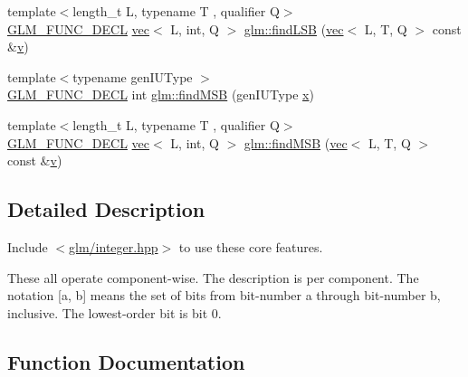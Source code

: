 \begin{DoxyCompactItemize}
{\footnotesize template$<$length\+\_\+t L, typename T , qualifier Q$>$ }\\\mbox{\hyperlink{setup_8hpp_ab2d052de21a70539923e9bcbf6e83a51}{G\+L\+M\+\_\+\+F\+U\+N\+C\+\_\+\+D\+E\+CL}} \mbox{\hyperlink{structglm_1_1vec}{vec}}$<$ L, int, Q $>$ \mbox{\hyperlink{group__core__func__integer_ga4454c0331d6369888c28ab677f4810c7}{glm\+::find\+L\+SB}} (\mbox{\hyperlink{structglm_1_1vec}{vec}}$<$ L, T, Q $>$ const \&\mbox{\hyperlink{_s_d_l__opengl_8h_a10a82eabcb59d2fcd74acee063775f90}{v}})
\item 
{\footnotesize template$<$typename gen\+I\+U\+Type $>$ }\\\mbox{\hyperlink{setup_8hpp_ab2d052de21a70539923e9bcbf6e83a51}{G\+L\+M\+\_\+\+F\+U\+N\+C\+\_\+\+D\+E\+CL}} int \mbox{\hyperlink{group__core__func__integer_ga7e4a794d766861c70bc961630f8ef621}{glm\+::find\+M\+SB}} (gen\+I\+U\+Type \mbox{\hyperlink{_s_d_l__opengl_8h_ad0e63d0edcdbd3d79554076bf309fd47}{x}})
\item 
{\footnotesize template$<$length\+\_\+t L, typename T , qualifier Q$>$ }\\\mbox{\hyperlink{setup_8hpp_ab2d052de21a70539923e9bcbf6e83a51}{G\+L\+M\+\_\+\+F\+U\+N\+C\+\_\+\+D\+E\+CL}} \mbox{\hyperlink{structglm_1_1vec}{vec}}$<$ L, int, Q $>$ \mbox{\hyperlink{group__core__func__integer_ga39ac4d52028bb6ab08db5ad6562c2872}{glm\+::find\+M\+SB}} (\mbox{\hyperlink{structglm_1_1vec}{vec}}$<$ L, T, Q $>$ const \&\mbox{\hyperlink{_s_d_l__opengl_8h_a10a82eabcb59d2fcd74acee063775f90}{v}})
\end{DoxyCompactItemize}


\subsection{Detailed Description}
Include $<$\mbox{\hyperlink{integer_8hpp}{glm/integer.\+hpp}}$>$ to use these core features.

These all operate component-\/wise. The description is per component. The notation \mbox{[}a, b\mbox{]} means the set of bits from bit-\/number a through bit-\/number b, inclusive. The lowest-\/order bit is bit 0. 

\subsection{Function Documentation}
\mbox{\label{group__core__func__integer_ga44abfe3379e11cbd29425a843420d0d6}} 
